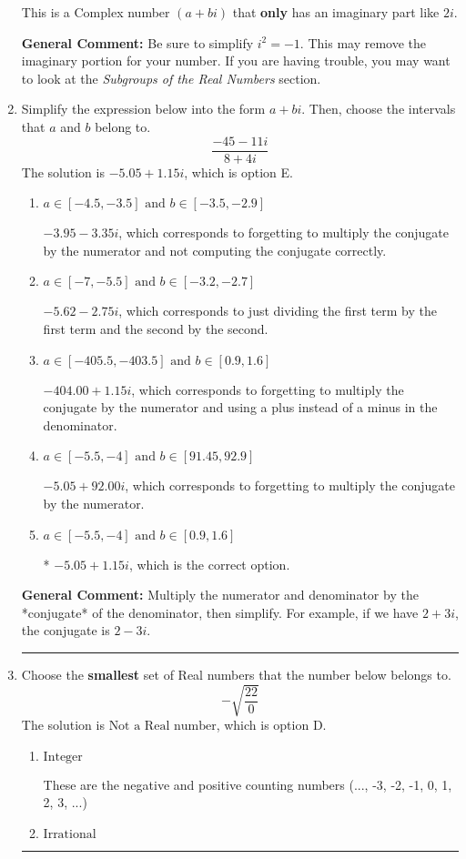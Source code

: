 \documentclass{extbook}[14pt]
\newcommand{\litem}[1]{\item #1

\rule{\textwidth}{0.4pt}}
\begin{document}
\begin{enumerate}
{\begin{enumerate}[label=\Alph*.]
This is a Complex number $(a+bi)$ that \textbf{only} has an imaginary part like $2i$.
\end{enumerate}

\textbf{General Comment:} Be sure to simplify $i^2 = -1$. This may remove the imaginary portion for your number. If you are having trouble, you may want to look at the \textit{Subgroups of the Real Numbers} section.
}
\litem{
Simplify the expression below into the form $a+bi$. Then, choose the intervals that $a$ and $b$ belong to.
\[ \frac{-45 - 11 i}{8 + 4 i} \]The solution is \( -5.05  + 1.15 i \), which is option E.\begin{enumerate}[label=\Alph*.]
\item \( a \in [-4.5, -3.5] \text{ and } b \in [-3.5, -2.9] \)

 $-3.95  - 3.35 i$, which corresponds to forgetting to multiply the conjugate by the numerator and not computing the conjugate correctly.
\item \( a \in [-7, -5.5] \text{ and } b \in [-3.2, -2.7] \)

 $-5.62  - 2.75 i$, which corresponds to just dividing the first term by the first term and the second by the second.
\item \( a \in [-405.5, -403.5] \text{ and } b \in [0.9, 1.6] \)

 $-404.00  + 1.15 i$, which corresponds to forgetting to multiply the conjugate by the numerator and using a plus instead of a minus in the denominator.
\item \( a \in [-5.5, -4] \text{ and } b \in [91.45, 92.9] \)

 $-5.05  + 92.00 i$, which corresponds to forgetting to multiply the conjugate by the numerator.
\item \( a \in [-5.5, -4] \text{ and } b \in [0.9, 1.6] \)

* $-5.05  + 1.15 i$, which is the correct option.
\end{enumerate}

\textbf{General Comment:} Multiply the numerator and denominator by the *conjugate* of the denominator, then simplify. For example, if we have $2+3i$, the conjugate is $2-3i$.
}
\litem{
Choose the \textbf{smallest} set of Real numbers that the number below belongs to.
\[ -\sqrt{\frac{22}{0}} \]The solution is \( \text{Not a Real number} \), which is option D.\begin{enumerate}[label=\Alph*.]
\item \( \text{Integer} \)

These are the negative and positive counting numbers (..., -3, -2, -1, 0, 1, 2, 3, ...)
\item \( \text{Irrational} \)


\end{enumerate}}
\end{enumerate}
\end{document}
